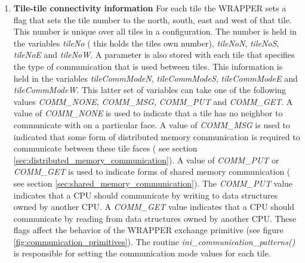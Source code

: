 \begin{enumerate}
\item {\bf Tile-tile connectivity information} For each tile the WRAPPER
sets a flag that sets the tile number to the north, south, east and
west of that tile. This number is unique over all tiles in a 
configuration. The number is held in the variables {\em tileNo}
( this holds the tiles own number), {\em tileNoN}, {\em tileNoS},
{\em tileNoE} and {\em tileNoW}. A parameter is also stored with each tile
that specifies the type of communication that is used between tiles.
This information is held in the variables {\em tileCommModeN},
{\em tileCommModeS}, {\em tileCommModeE} and {\em tileCommModeW}.
This latter set of variables can take one of the following values
{\em COMM\_NONE}, {\em COMM\_MSG}, {\em COMM\_PUT} and {\em COMM\_GET}.
A value of {\em COMM\_NONE} is used to indicate that a tile has no
neighbor to communicate with on a particular face. A value
of {\em COMM\_MSG} is used to indicated that some form of distributed
memory communication is required to communicate between
these tile faces ( see section \ref{sec:distributed_memory_communication}).
A value of {\em COMM\_PUT} or {\em COMM\_GET} is used to indicate 
forms of shared memory communication ( see section 
\ref{sec:shared_memory_communication}). The {\em COMM\_PUT} value indicates 
that a CPU should communicate by writing to data structures owned by another 
CPU. A {\em COMM\_GET} value indicates that a CPU should communicate by reading
from data structures owned by another CPU. These flags affect the behavior
of the WRAPPER exchange primitive 
(see figure \ref{fig:communication_primitives}). The routine 
{\em ini\_communication\_patterns()} is responsible for setting the
communication mode values for each tile.
\\

 \\


\end{enumerate}
